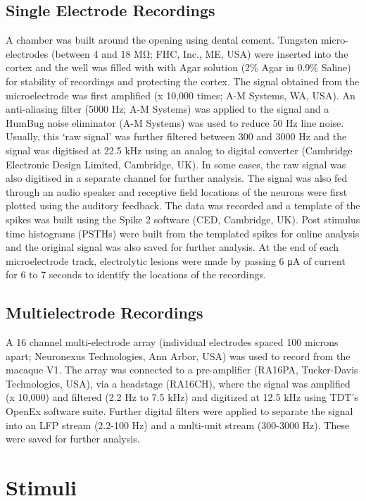 		\subsection{Single Electrode Recordings}
		
		A chamber was built around the opening using dental cement. Tungsten micro-electrodes (between 4 and 18 MΩ; FHC, Inc., ME, USA) were inserted into the cortex and the well was filled with with Agar solution (2\% Agar in 0.9\% Saline) for stability of recordings and protecting the cortex. The signal obtained from the microelectrode was first amplified (x 10,000 times; A-M Systems, WA, USA). An anti-aliasing filter (5000 Hz; A-M Systems) was applied to the signal and a HumBug noise eliminator (A-M Systems) was used to reduce 50 Hz line noise. Usually, this ‘raw signal’ was further filtered between 300 and 3000 Hz and the signal was digitised at 22.5 kHz using an analog to digital converter (Cambridge Electronic Design Limited, Cambridge, UK).  In some cases, the raw signal was also digitised in a separate channel for further analysis. The signal was also fed through an audio speaker and receptive field locations of the neurons were first plotted using the auditory feedback. The data was recorded and a template of the spikes was built using the Spike 2 software (CED, Cambridge, UK). Post stimulus time histograms (PSTHs) were built from the templated spikes for online analysis and the original signal was also saved for further analysis. At the end of each microelectrode track, electrolytic lesions were made by passing 6 μA of current for 6 to 7 seconds to identify the locations of the recordings.
		
		\subsection{Multielectrode Recordings}
		
		A 16 channel multi-electrode array (individual electrodes spaced 100 microns apart; Neuronexus Technologies, Ann Arbor, USA) was used to record from the macaque V1. The array was connected to a pre-amplifier (RA16PA, Tucker-Davis Technologies, USA), via a headstage (RA16CH), where the signal was amplified (x 10,000) and filtered (2.2 Hz to 7.5 kHz) and digitized at 12.5 kHz using TDT’s OpenEx software suite. Further digital filters were applied to separate the signal into an LFP stream (2.2-100 Hz) and a multi-unit stream (300-3000 Hz). These were saved for further analysis.
		
	\section{Stimuli}
	

